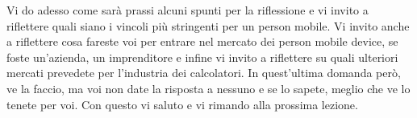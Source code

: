 Vi do adesso come sarà prassi alcuni spunti per la riflessione e vi invito a riflettere quali siano i vincoli più stringenti per un person mobile.
Vi invito anche a riflettere cosa fareste voi per entrare nel mercato dei person mobile device, se foste un'azienda, un imprenditore e infine vi invito a riflettere su quali ulteriori mercati prevedete per l'industria dei calcolatori.
In quest'ultima domanda però, ve la faccio, ma voi non date la risposta a nessuno e se lo sapete, meglio che ve lo tenete per voi.
Con questo vi saluto e vi rimando alla prossima lezione.



